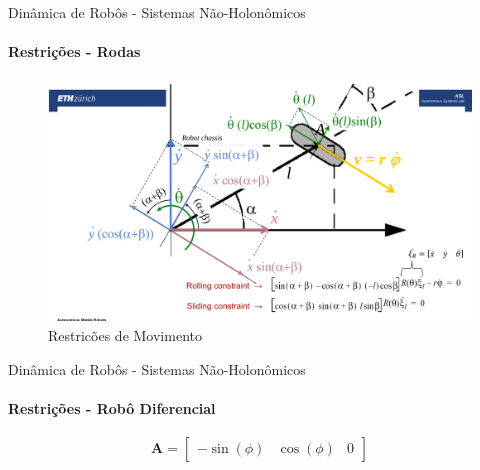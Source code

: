 \documentclass{beamer}
\begin{document}
\begin{frame}{Dinâmica de Robôs - Sistemas Não-Holonômicos}
    \framesubtitle{Restrições - Rodas}

    \begin{figure}
        \centering
        \includegraphics[width=1\textwidth]{./images/wheels_const.png}
        \caption{Restricões de Movimento}
    \end{figure}
    

\end{frame}


\begin{frame}{Dinâmica de Robôs - Sistemas Não-Holonômicos}
    \framesubtitle{Restrições - Robô Diferencial}

    \centering
    

    \begin{equation}
        \mathbf{A} = 
        \begin{bmatrix}
            -\sin(\phi) & \cos(\phi) & 0
        \end{bmatrix}
    \end{equation}

\end{frame}
\end{document}
